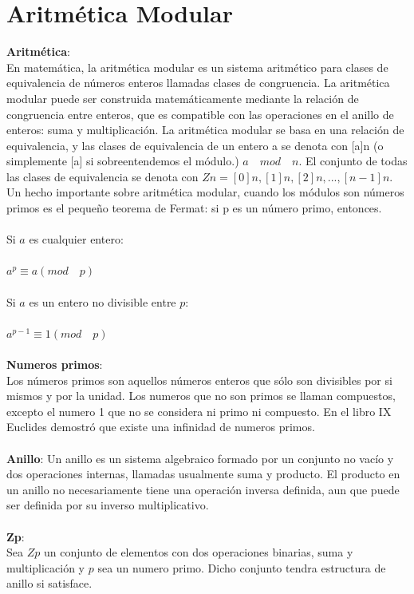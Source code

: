 \documentclass[12pt,oneside,onecolumn,openany]{report}
\begin{document}
\section{Aritmética Modular}
\textbf{Aritmética}:\\
En matemática, la aritmética modular es un sistema aritmético para clases de equivalencia de números enteros llamadas clases de congruencia.
La aritmética modular puede ser construida matemáticamente mediante la relación de congruencia entre enteros, que es compatible con las operaciones en el anillo de enteros: suma y multiplicación.
La aritmética modular se basa en una relación de equivalencia, y las clases de equivalencia de un entero a se denota con [a]n (o simplemente [a] si sobreentendemos el módulo.) $a\quad mod\quad n$. El conjunto de todas las clases de equivalencia se denota con $Zn = { [0]n, [1]n, [2]n,..., [n-1]n }.$
Un hecho importante sobre aritmética modular, cuando los módulos son números primos es el pequeño teorema de Fermat: si p es un número primo, entonces.\cite{modular}\\\\
Si $a$ es cualquier entero:\\\\
$a^p\equiv a(mod\quad p)$\\\\
Si $a$ es un entero no divisible entre $p$:\\\\
$a^{p-1}\equiv 1(mod\quad p)$\\\\
\textbf{Numeros primos}:\\
Los números primos son aquellos números enteros que sólo son divisibles por si mismos y por la unidad. Los numeros que no son primos se llaman compuestos, excepto el numero 1 que no se considera ni primo ni compuesto. En el libro IX Euclides demostró que existe una infinidad de numeros primos.\\\\
\textbf{Anillo}: Un anillo es un sistema algebraico formado por un conjunto no vacío y dos operaciones internas, llamadas usualmente suma y producto. El producto en un anillo no necesariamente tiene una operación inversa definida, aun que puede ser definida por su inverso multiplicativo.\cite{anil}\\\\ 
\textbf{Zp}:\\
Sea $Zp$ un conjunto de elementos con dos operaciones binarias, suma y multiplicación y $p$ sea un numero primo. Dicho conjunto tendra estructura de anillo si satisface.\cite{zp}
\end{document}

